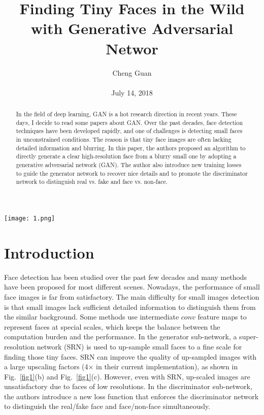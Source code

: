 \documentclass[10pt,twocolumn,letterpaper]{article}
\title{Finding Tiny Faces in the Wild with Generative Adversarial Networ}
\author{Cheng Guan\\\\
	July 14, 2018}
\begin{document}
\maketitle
\begin{abstract}
In the field of deep learning, GAN is a hot research direction in recent years. These days, I decide to read some papers about GAN. Over the past decades, face detection techniques have been developed rapidly, and one of  challenges is detecting small faces in unconstrained conditions. The reason is
that tiny face images are often lacking detailed information and
blurring. In this paper, the authors proposed an algorithm to directly 
generate a clear high-resolution face from a blurry small
one by adopting a generative adversarial network (GAN).
The author also introduce new training losses to guide the generator network to 
recover nice details and to promote the discriminator network 
to distinguish real vs. fake and face vs. non-face.
\end{abstract}
\begin{figure*}[hb]
	\centering
	\texttt{[image: 1.png]}
	\caption{The detection results of tiny faces in the wild. (a) is the original low-resolution blurry face, (b) is the result of
		re-sizing directly by a bi-linear kernel, (c) is the generated image by the super-resolution method, and our result (d) is learned
		by the super-resolution ($\times$4 upscaling) and refinement network simultaneously. Best viewed in color and zoomed in.}
	\label{fig1}
\end{figure*}
\section{Introduction}
Face detection has been  studied over the past
few decades and many methods have been proposed for most different scenes. Nowadays, 
the performance of small face images is far from satisfactory. 
The main difficulty for small images detection is that small 
images lack sufficient detailed information to distinguish them 
from the similar background. Some methods \cite{chakrabarti2016neural,zhu2016cms} use 
intermediate $conv$ feature maps to represent faces at special
scales, which keeps the balance between the computation burden 
and the performance. In the generator sub-network, a super-resolution network (SRN) 
is used to up-sample small faces to a fine scale
for finding those tiny faces. SRN can improve
the quality of up-sampled images with a large upscaling factors (4$\times$ in their current implementation), 
as shown in Fig.~\ref{fig1}(b) 
and Fig.~\ref{fig1}(c). However, even with SRN, up-scaled images are unsatisfactory due to faces of low resolutions.
In the discriminator sub-network, the authors introduce a
new loss function that enforces the discriminator network to
distinguish the real/fake face and face/non-face simultaneously.
%
\end{document}
